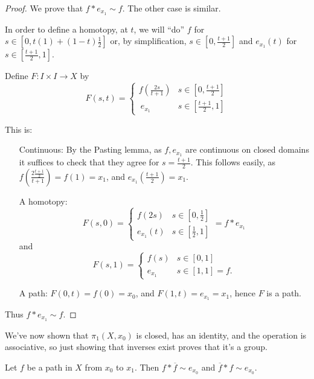 \begin{proof}
	We prove that $f* e_{x_1}\sim f$. The other case is similar.
	
	In order to define a homotopy, at $t$, we will ``do'' $f$ for $s\in [0,t(1)+(1-t)\tfrac{1}{2}]$ or, by simplification, $s\in[0,\tfrac{t+1}{2}]$ and $e_{x_1}(t)$ for $s\in [\tfrac{t+1}{2},1]$.
	
	Define $F:I\times I \to X$ by
	\[F(s,t)= 
	\begin{cases}
		f\left(\tfrac{2s}{t+1}\right) & s\in \left[0,\tfrac{t+1}{2}\right] \\\
		e_{x_1} & s\in \left[\frac{t+1}{2},1\right] 
	\end{cases}
	\]
	
	This is: 
	\begin{itemize}
		\item[Continuous:] By the Pasting lemma, as $f, e_{x_1}$ are continuous on closed domains it suffices to check that they agree for $s=\tfrac{t+1}{2}$. This follows easily, as $f\left(\frac{2\tfrac{t+1}{2}}{t+1}\right)=f(1)=x_1$, and $e_{x_1}\left(\tfrac{t+1}{2}\right)=x_1$. 
		\item[A homotopy:]
		\[F(s,0)= 
		\begin{cases}
			f(2s) & s\in\left[0,\tfrac{1}{2}\right]\\
			e_{x_1}(t) & s\in\left[\tfrac{1}{2},1\right] 
		\end{cases}
		= f*e_{x_1}\]
		and
		\[F(s,1)= 
		\begin{cases}
			f(s) & s\in [0,1]\\
			e_{x_1} & s\in [1,1]=f. 
		\end{cases}
		\]
		\item[ A path: ] $F(0,t)=f(0)=x_0$, and $F(1,t)=e_{x_1}=x_1$, hence $F$ is a path. 
	\end{itemize}
	Thus $f*e_{x_1}\sim f$. 
\end{proof}

We've now shown that $\pi_1(X, x_0)$ is closed, has an identity, and the operation is associative, so just showing that inverses exist proves that it's a group. 
\begin{lemma}
	[Inverses] Let $f$ be a path in $X$ from $x_0$ to $x_1$. Then $f*\overline{f}\sim e_{x_0}$ and $\overline{f}*f\sim e_{x_0}$. 
\end{lemma}

